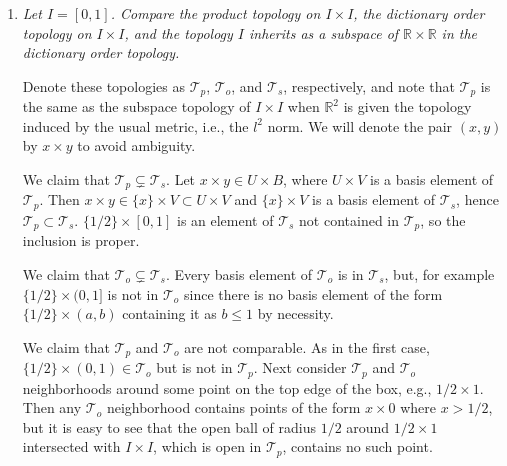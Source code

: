 \documentclass[11pt]{article}
\newcommand{\R}{\mathbb{R}}
\newcommand{\T}{\mathcal{T}}
\begin{document}
\begin{enumerate}
In the first case, either $L$ is vertical or it is not.  If it is then the subspace topology on $L$ is simply the standard topology on $\R$.  If $L$ is not vertical then the topology is the lower-limit topology, since in this case $L$ can intersect the closed edge of the basis ``rectangle'' $[a,b) \times (c,d)$ for some $a,b,c,d$.

In the seconds case, either $L$ has positive slope or is vertical, or $L$ has negative slope.  In the first case the topology is again the lower-limit topology since $L$ will only intersect at most one of the closed edges.  If $L$ has negative slope then the topology is the discrete topology since for any $(x,y) \in L$, $[x,x+1) \times [y,y+1)$ is a basis element containing $(x,y)$.  If every point is open, then the topology is necessarily the discrete topology.

\item \emph{Let $I = [0,1]$.  Compare the product topology on $I \times I$, the dictionary order topology on $I \times I$, and the topology $I$ inherits as a subspace of $\R \times \R$ in the dictionary order topology.}

Denote these topologies as $\T_p$, $\T_o$, and $\T_s$, respectively, and note that $\T_p$ is the same as the subspace topology of $I \times I$ when $\R^2$ is given the topology induced by the usual metric, i.e., the $l^2$ norm.  We will denote the pair $(x,y)$ by $x \times y$ to avoid ambiguity.

We claim that $\T_p \subsetneq \T_s$.  Let $x \times y \in U \times B$, where $U \times V$ is a basis element of $\T_p$. 
 Then $x \times y \in \{x\} \times V \subset U \times V$ and $\{x\} \times V$ is a basis element of $\T_s$, hence $\T_p \subset \T_s$.  $\{1/2\} \times [0,1]$ is an element of $\T_s$ not contained in $\T_p$, so the inclusion is proper.

We claim that $\T_o \subsetneq \T_s$.  Every basis element of $\T_o$ is in $\T_s$, but, for example $\{1/2\} \times (0,1]$ is not in $\T_o$ since there is no basis element of the form $\{1/2\} \times (a,b)$ containing it as $b \leq 1$ by necessity.

We claim that $\T_p$ and $\T_o$ are not comparable.  As in the first case, $\{1/2\} \times (0,1) \in \T_o$ but is not in $\T_p$.  Next consider $\T_p$ and $\T_o$ neighborhoods around some point on the top edge of the box, e.g., $1/2 \times 1$.  Then any $\T_o$ neighborhood contains points of the form $x \times 0$ where $x > 1/2$, but it is easy to see that the open ball of radius $1/2$ around $1/2 \times 1$ intersected with $I \times I$, which is open in $\T_p$, contains no such point.


\end{enumerate}
\end{document}
